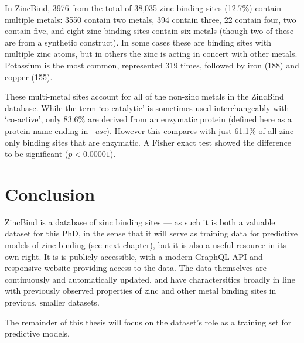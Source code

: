In ZincBind, 3976 from the total of 38,035 zinc binding sites (12.7\%) contain multiple metals: 3550 contain two metals, 394 contain three, 22 contain four, two contain five, and eight zinc binding sites contain six metals (though two of these are from a synthetic construct). In some cases these are binding sites with multiple zinc atoms, but in others the zinc is acting in concert with other metals. Potassium is the most common, represented 319 times, followed by iron (188) and copper (155).

These multi-metal sites account for all of the non-zinc metals in the ZincBind database. While the term `co-catalytic' is sometimes used interchangeably with `co-active', only 83.6\% are derived from an enzymatic protein (defined here as a protein name ending in \emph{--ase}). However this compares with just 61.1\% of all zinc-only binding sites that are enzymatic. A Fisher exact test showed the difference to be significant ($p<0.00001$).

\section{Conclusion}

ZincBind is a database of zinc binding sites --- as such it is both a valuable dataset for this PhD, in the sense that it will serve as training data for predictive models of zinc binding (see next chapter), but it is also a useful resource in its own right. It is is publicly accessible, with a modern GraphQL API and responsive website providing access to the data. The data themselves are continuously and automatically updated, and have charactersitics broadly in line with previously observed properties of zinc and other metal binding sites in previous, smaller datasets.

The remainder of this thesis will focus on the dataset's role as a training set for predictive models.